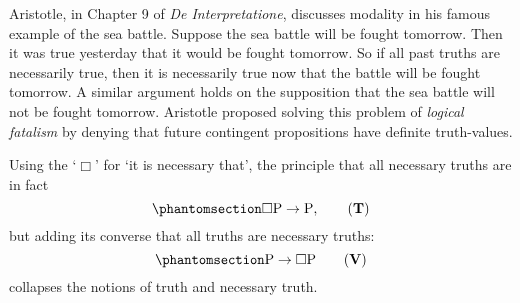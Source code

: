 \documentclass[
  12pt,
  letterpaper,
  DIV=11,
  numbers=noendperiod,
  twoside]{scrreprt}
\theoremstyle{remark}
\begin{document}
Aristotle, in Chapter 9 of \emph{De Interpretatione}, discusses modality
in his famous example of the sea battle. Suppose the sea battle will be
fought tomorrow. Then it was true yesterday that it would be fought
tomorrow. So if all past truths are necessarily true, then it is
necessarily true now that the battle will be fought tomorrow. A similar
argument holds on the supposition that the sea battle will not be fought
tomorrow. Aristotle proposed solving this problem of \emph{logical
fatalism} by denying that future contingent propositions have definite
truth-values.

Using the `\(\Box\)' for `it is necessary that', the principle that all
necessary truths are in fact
\begin{equation}\phantomsection\label{eq-modal-axiom-T}{
\Box \mathrm{P}\to \mathrm{P},\tag*{(\textbf{T})}
}\end{equation} but adding its converse that all truths are necessary
truths: \begin{equation}\phantomsection\label{eq-modal-axiom-V}{
\mathrm{P} \to \Box \mathrm{P} \tag*{(\textbf{V})}
}\end{equation} collapses the notions of truth and necessary truth.
\end{document}
